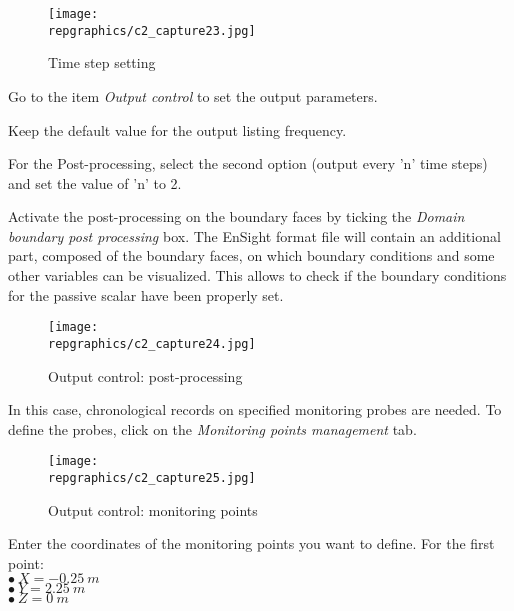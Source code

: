 \begin{figure}[h!]
\begin{center}
\texttt{[image: \\repgraphics/c2\_capture23.jpg]} 
\caption{Time step setting}
\label{fig23_e2}
\end{center}
\end{figure}


\newpage
Go to the item {\itshape Output control} to set the output parameters.

Keep the default value for the output listing frequency.

For the Post-processing, select the second option (output every 'n' time steps)
and set the value of 'n' to 2.

Activate the post-processing on the boundary faces by ticking the 
{\itshape Domain boundary post processing} box. The EnSight format file will
contain an additional part, composed of the boundary faces, on which boundary
conditions and some other variables can be visualized. This allows to check if
the boundary conditions for the passive scalar have been properly set.

\begin{figure}[h!]
\begin{center}
\texttt{[image: \\repgraphics/c2\_capture24.jpg]} 
\caption{Output control: post-processing}
\label{fig24_e2}
\end{center}
\end{figure}


\newpage
In this case, chronological records on specified monitoring probes are needed.
To define the probes, click on the
{\itshape Monitoring points management} tab. 

\begin{figure}[h!]
\begin{center}
\texttt{[image: \\repgraphics/c2\_capture25.jpg]} 
\caption{Output control: monitoring points}
\label{fig25_e2}
\end{center}
\end{figure}



\newpage
Enter the coordinates of the monitoring points you want to define. For the first point:\\
\hspace*{1cm}$\bullet\ X = -0.25\ m$\\
\hspace*{1cm}$\bullet\ Y = 2.25\ m$\\
\hspace*{1cm}$\bullet\ Z = 0\ m$ 

